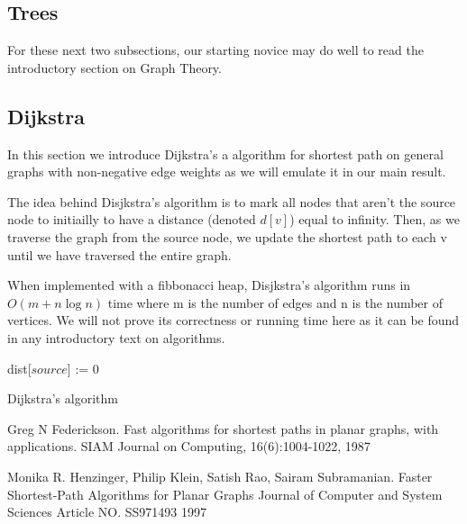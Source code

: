 \documentclass[12pt]{article}
\theoremstyle{definition}
\begin{document}
\subsection{Trees}
For these next two subsections, our starting novice may do well to read the introductory section on Graph Theory.


\subsection{Dijkstra}
In this section we introduce Dijkstra's a algorithm for shortest path on general graphs with non-negative edge weights as we will emulate it in our main result.

The idea behind Disjkstra's algorithm is to mark all nodes that aren't the source node to initiailly to have a distance (denoted $d[v]$) equal to infinity. 
Then, as we traverse the graph from the source node, we update the shortest path to each v until we have traversed the entire graph.

When implemented with a fibbonacci heap, Disjkstra's algorithm runs in $O (m + n\log n)$ time where m is the number of edges and n is the number of vertices.
We will not prove its correctness or running time here as it can be found in any introductory text on algorithms. 

\begin{algorithm}[H]
\DontPrintSemicolon
dist[$source$] := 0\;
\caption{Dijkstra's algorithm}
\end{algorithm}


\begin{thebibliography}{9}
	Greg N Federickson.
	Fast algorithms for shortest paths in planar graphs, with applications.
	SIAM Journal on Computing, 16(6):1004-1022,
	1987

	Monika R. Henzinger, Philip Klein, Satish Rao, Sairam Subramanian.
	Faster Shortest-Path Algorithms for Planar Graphs
	Journal of Computer and System Sciences Article NO. SS971493
	1997

\end{thebibliography}
\end{document}

